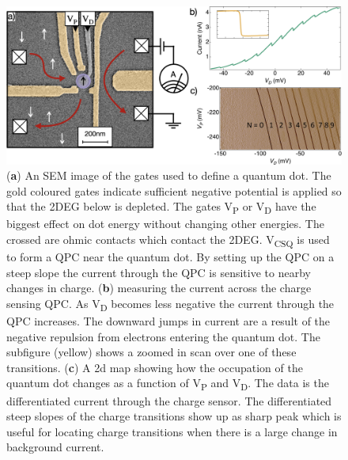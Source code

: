 \begin{figure}[!htb]
  \begin{center}
    \includegraphics[width=1.0\textwidth]{figures/ch1/crop_PosterFiguresMaster.004.png}
    \caption[Charge sensing a quantum dot]{\label{fig:ch1/ct_intro} 
    (\textbf{a}) An SEM image of the gates used to define a quantum dot. The gold coloured gates indicate sufficient negative potential is applied so that the 2DEG below is depleted. The gates V\textsubscript{P} or V\textsubscript{D} have the biggest effect on dot energy without changing other energies. The crossed are ohmic contacts which contact the 2DEG. V\textsubscript{CSQ} is used to form a QPC near the quantum dot. By setting up the QPC on a steep slope the current through the QPC is sensitive to nearby changes in charge. (\textbf{b}) measuring the current across the charge sensing QPC. As V\textsubscript{D} becomes less negative the current through the QPC increases. The downward jumps in current are a result of the negative repulsion from electrons entering the quantum dot. The subfigure (yellow) shows a zoomed in scan over one of these transitions. (\textbf{c}) A 2d map showing how the occupation of the quantum dot changes as a function of V\textsubscript{P} and V\textsubscript{D}. The data is the differentiated current through the charge sensor. The differentiated steep slopes of the charge transitions show up as sharp peak which is useful for locating charge transitions when there is a large change in background current. 
      }
  \end{center}
\end{figure}

